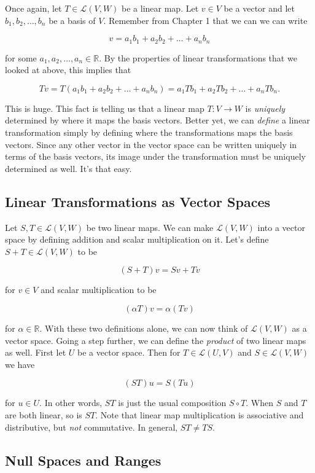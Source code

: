 \documentclass[12pt]{article}
\begin{document}
Once again, let $T \in \mathcal{L}(V, W)$ be a linear map. Let $v \in V$ be a vector and let $b_1, b_2, \ldots, b_n$ be a basis of $V$.  Remember from Chapter 1 that we can we can write

$$v = a_1 b_1 + a_2 b_2 + \ldots + a_n b_n$$

for some $a_1, a_2, \ldots, a_n \in \mathbb{R}$. By the properties of linear transformations that we looked at above, this implies that

$$Tv = T(a_1 b_1 + a_2 b_2 + \ldots + a_n b_n) = a_1 T b_1 + a_2 T b_2 + \ldots + a_n T b_n.$$

This is huge. This fact is telling us that a linear map $T : V \rightarrow W$ is \textit{uniquely} determined by where it maps the basis vectors. Better yet, we can \textit{define} a linear transformation simply by defining where the transformations maps the basis vectors. Since any other vector in the vector space can be written uniquely in terms of the basis vectors, its image under the transformation must be uniquely determined as well. It's that easy. 

\subsection*{Linear Transformations as Vector Spaces}

Let $S, T \in \mathcal{L} (V, W)$ be two linear maps. We can make $\mathcal{L}(V, W)$ into a vector space by defining addition and scalar multiplication on it. Let's define $S + T \in \mathcal{L}(V, W)$ to be 

$$(S + T)v = Sv + Tv$$

for $v \in V$ and scalar multiplication to be

$$(\alpha T)v = \alpha (Tv)$$

for $\alpha \in \mathbb{R}$. With these two definitions alone, we can now think of $\mathcal{L} (V, W)$ as a vector space. Going a step further, we can define the \textit{product} of two linear maps as well. First let $U$ be a vector space. Then for $T \in \mathcal{L} (U, V)$ and $S \in \mathcal{L} (V, W)$ we have

$$(ST)u = S(Tu)$$

for $u \in U$. In other words, $ST$ is just the usual composition $S \circ T$. When $S$ and $T$ are both linear, so is $ST$. Note that linear map multiplication is associative and distributive, but \textit{not} commutative. In general, $ST \neq TS$.

\subsection*{Null Spaces and Ranges}
\end{document}
